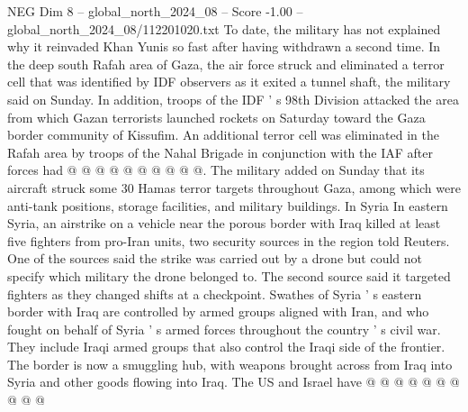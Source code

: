 \begin{textsample}{NEG Dim 8 – global\_north\_2024\_08 – Score -1.00 – global\_north\_2024\_08/112201020.txt}
To date, the military has not explained why it reinvaded Khan Yunis so fast after having withdrawn a second time.
In the deep south Rafah area of Gaza, the air force struck and eliminated a terror cell that was identified by IDF observers as it exited a tunnel shaft, the military said on Sunday.
In addition, troops of the IDF ' s 98th Division attacked the area from which Gazan terrorists launched rockets on Saturday toward the Gaza border community of Kissufim.
An additional terror cell was eliminated in the Rafah area by troops of the Nahal Brigade in conjunction with the IAF after forces had @ @ @ @ @ @ @ @ @ @.
The military added on Sunday that its aircraft struck some 30 Hamas terror targets throughout Gaza, among which were anti-tank positions, storage facilities, and military buildings.
In Syria In eastern Syria, an airstrike on a vehicle near the porous border with Iraq killed at least five fighters from pro-Iran units, two security sources in the region told Reuters.
One of the sources said the strike was carried out by a drone but could not specify which military the drone belonged to.
The second source said it targeted fighters as they changed shifts at a checkpoint.
Swathes of Syria ' s eastern border with Iraq are controlled by armed groups aligned with Iran, and who fought on behalf of Syria ' s armed forces throughout the country ' s civil war.
They include Iraqi armed groups that also control the Iraqi side of the frontier.
The border is now a smuggling hub, with weapons brought across from Iraq into Syria and other goods flowing into Iraq.
The US and Israel have @ @ @ @ @ @ @ @ @ @

\end{textsample}
